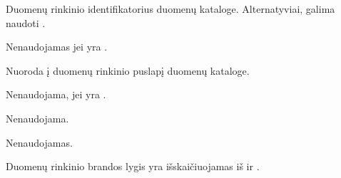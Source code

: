 \documentclass[letterpaper,10pt,lithuanian]{sphinxmanual}
\begin{document}

\begin{fulllineitems}
\label{\detokenize{dimensijos:dataset.ref}}
\pysigstartsignatures
{}
\pysigstopsignatures
\sphinxAtStartPar
Duomenų rinkinio identifikatorius duomenų kataloge. Alternatyviai, galima
naudoti {\hyperref[\detokenize{dimensijos:dataset.source}]{}}.

\sphinxAtStartPar
Nenaudojamas jei {\hyperref[\detokenize{dimensijos:dataset.type}]{}} yra .

\end{fulllineitems}


\begin{fulllineitems}
\label{\detokenize{dimensijos:dataset.source}}
\pysigstartsignatures
{}
\pysigstopsignatures
\sphinxAtStartPar
Nuoroda į duomenų rinkinio puslapį duomenų kataloge.

\sphinxAtStartPar
Nenaudojama, jei  yra .

\end{fulllineitems}


\begin{fulllineitems}
\label{\detokenize{dimensijos:dataset.prepare}}
\pysigstartsignatures
{}
\pysigstopsignatures
\sphinxAtStartPar
Nenaudojama.

\end{fulllineitems}


\begin{fulllineitems}
\label{\detokenize{dimensijos:dataset.level}}
\pysigstartsignatures
{}
\pysigstopsignatures
\sphinxAtStartPar
Nenaudojamas.

\sphinxAtStartPar
Duomenų rinkinio brandos lygis yra išskaičiuojamas iš {\hyperref[\detokenize{dimensijos:model.level}]{}}
ir {\hyperref[\detokenize{dimensijos:property.level}]{}}.

\end{fulllineitems}
\end{document}
